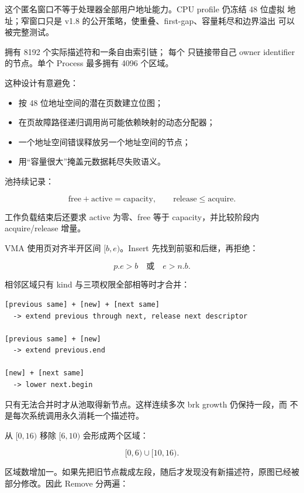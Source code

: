 这个匿名窗口不等于处理器全部用户地址能力。CPU profile 仍冻结 48 位虚拟
地址；窄窗口只是 v1.8 的公开策略，使重叠、first-gap、容量耗尽和边界溢出
可以被完整测试。

 拥有 8192 个实际描述符和一条自由索引链；
每个  只链接带自己 owner identifier 的节点。单个
Process 最多拥有 4096 个区域。

这种设计有意避免：

\begin{itemize}
  \item 按 48 位地址空间的潜在页数建立位图；
  \item 在页故障路径递归调用尚可能依赖映射的动态分配器；
  \item 一个地址空间错误释放另一个地址空间的节点；
  \item 用“容量很大”掩盖元数据耗尽失败语义。
\end{itemize}

池持续记录：

\[
  \mathrm{free}+\mathrm{active}=\mathrm{capacity},
  \qquad
  \mathrm{release}\le\mathrm{acquire}.
\]

工作负载结束后还要求 active 为零、free 等于 capacity，并比较阶段内
acquire/release 增量。

VMA 使用页对齐半开区间 \([b,e)\)。Insert 先找到前驱和后继，再拒绝：

\[
  p.e>b\quad\text{或}\quad e>n.b.
\]

相邻区域只有 kind 与三项权限全部相等时才合并：

\begin{lstlisting}[caption={相邻区域的三种合并}]
[previous same] + [new] + [next same]
  -> extend previous through next, release next descriptor

[previous same] + [new]
  -> extend previous.end

[new] + [next same]
  -> lower next.begin
\end{lstlisting}

只有无法合并时才从池取得新节点。这样连续多次 brk growth 仍保持一段，而
不是每次系统调用永久消耗一个描述符。

从 \([0,16)\) 移除 \([6,10)\) 会形成两个区域：

\[
  [0,6)\cup[10,16).
\]

区域数增加一。如果先把旧节点裁成左段，随后才发现没有新描述符，原图已经被
部分修改。因此 Remove 分两遍：

